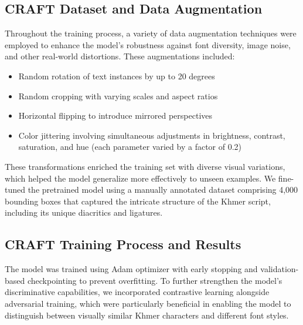 \subsection{CRAFT Dataset and Data Augmentation}
\label{subsec:craft-dataset}

Throughout the training process, a variety of data augmentation techniques were employed to enhance the model's robustness against font diversity, image noise, and other real-world distortions. These augmentations included:

\begin{itemize}
\item Random rotation of text instances by up to 20 degrees
\item Random cropping with varying scales and aspect ratios
\item Horizontal flipping to introduce mirrored perspectives
\item Color jittering involving simultaneous adjustments in brightness, contrast, saturation, and hue (each parameter varied by a factor of 0.2)
\end{itemize}

These transformations enriched the training set with diverse visual variations, which helped the model generalize more effectively to unseen examples. We fine-tuned the pretrained model using a manually annotated dataset comprising 4,000 bounding boxes that captured the intricate structure of the Khmer script, including its unique diacritics and ligatures.

\subsection{CRAFT Training Process and Results}
\label{subsec:craft-training-results}

The model was trained using Adam optimizer with early stopping and validation-based checkpointing to prevent overfitting. To further strengthen the model's discriminative capabilities, we incorporated contrastive learning alongside adversarial training, which were particularly beneficial in enabling the model to distinguish between visually similar Khmer characters and different font styles.

